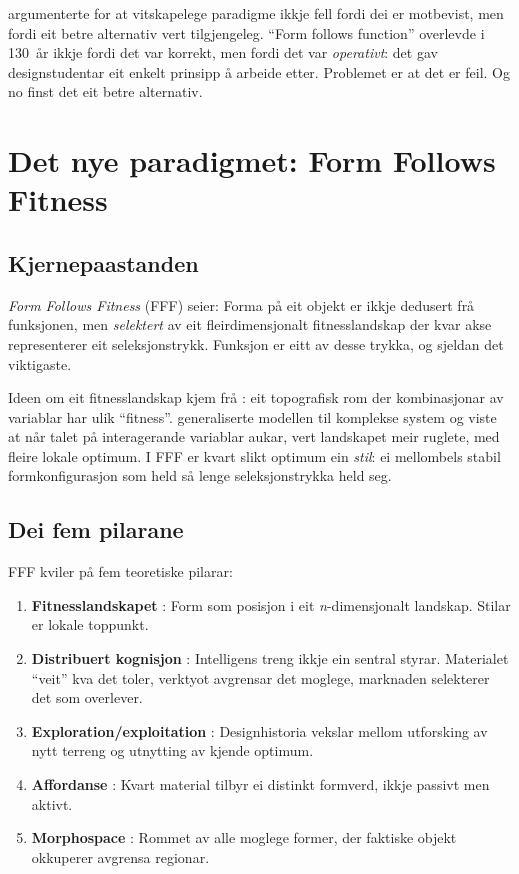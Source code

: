 \documentclass[12pt,a4paper]{article}
\begin{document}
\citet{kuhn1962} argumenterte for at vitskapelege paradigme ikkje fell fordi dei er motbevist, men fordi eit betre alternativ vert tilgjengeleg. \enquote{Form follows function} overlevde i 130~\aa{}r ikkje fordi det var korrekt, men fordi det var \emph{operativt}: det gav designstudentar eit enkelt prinsipp \aa{} arbeide etter. Problemet er at det er feil. Og no finst det eit betre alternativ.

\section{Det nye paradigmet: Form Follows Fitness}
\label{sec:fff}

\subsection{Kjernepaastanden}

\emph{Form Follows Fitness} (FFF) seier: Forma p\aa{} eit objekt er ikkje dedusert fr\aa{} funksjonen, men \emph{selektert} av eit fleirdimensjonalt fitnesslandskap der kvar akse representerer eit seleksjonstrykk. Funksjon er eitt av desse trykka, og sjeldan det viktigaste.

Ideen om eit fitnesslandskap kjem fr\aa{} \citet{wright1932}: eit topografisk rom der kombinasjonar av variablar har ulik \enquote{fitness}. \citet{kauffman1993} generaliserte modellen til komplekse system og viste at n\aa{}r talet p\aa{} interagerande variablar aukar, vert landskapet meir ruglete, med fleire lokale optimum. I FFF er kvart slikt optimum ein \emph{stil}: ei mellombels stabil formkonfigurasjon som held s\aa{} lenge seleksjonstrykka held seg.

\subsection{Dei fem pilarane}

FFF kviler p\aa{} fem teoretiske pilarar:

\begin{enumerate}[nosep]
    \item \textbf{Fitnesslandskapet} \citep{wright1932, kauffman1993}: Form som posisjon i eit \emph{n}-dimensjonalt landskap. Stilar er lokale toppunkt.
    \item \textbf{Distribuert kognisjon} \citep{nakagaki2000, levin2019, clark2008}: Intelligens treng ikkje ein sentral styrar. Materialet \enquote{veit} kva det toler, verktyot avgrensar det moglege, marknaden selekterer det som overlever.
    \item \textbf{Exploration/exploitation} \citep{sutton2018, gould1972}: Designhistoria vekslar mellom utforsking av nytt terreng og utnytting av kjende optimum.
    \item \textbf{Affordanse} \citep{gibson1977, pye1968}: Kvart material tilbyr ei distinkt formverd, ikkje passivt men aktivt.
    \item \textbf{Morphospace} \citep{raup1966}: Rommet av alle moglege former, der faktiske objekt okkuperer avgrensa regionar.
\end{enumerate}
\end{document}
